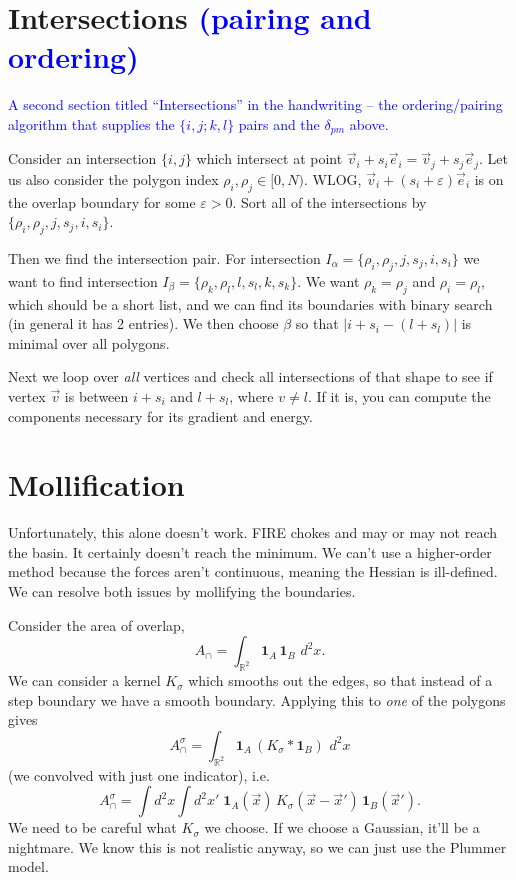\documentclass[11pt]{article}
\numberwithin{equation}{section}
\newcommand{\vv}[1]{\vec{#1}}
\newcommand{\eps}{\varepsilon}
\newcommand{\cam}[1]{\textcolor{blue}{#1}}
\begin{document}
\section{Intersections \cam{(pairing and ordering)}}

\cam{A second section titled ``Intersections'' in the handwriting -- the ordering/pairing algorithm
that supplies the $\{i,j;k,l\}$ pairs and the $\delta_{pm}$ above.}

Consider an intersection $\{i,j\}$ which intersect at point $\vv v_i+s_i\vv e_i=\vv v_j+s_j\vv e_j$.
Let us also consider the polygon index $\rho_i,\rho_j\in[0,N)$. WLOG, $\vv v_i+(s_i+\eps)\vv e_i$ is
on the overlap boundary for some $\eps>0$. Sort all of the intersections by
$\{\rho_i,\rho_j,j,s_j,i,s_i\}$.

Then we find the intersection pair. For intersection $I_\alpha=\{\rho_i,\rho_j,j,s_j,i,s_i\}$ we want
to find intersection $I_\beta=\{\rho_k,\rho_l,l,s_l,k,s_k\}$. We want $\rho_k=\rho_j$ and
$\rho_i=\rho_l$, which should be a short list, and we can find its boundaries with binary search (in
general it has 2 entries). We then choose $\beta$ so that $|i+s_i-(l+s_l)|$ is minimal over all
polygons.

Next we loop over \emph{all} vertices and check all intersections of that shape to see if vertex
$\vv v$ is between $i+s_i$ and $l+s_l$, where $v\neq l$. If it is, you can compute the components
necessary for its gradient and energy.

\section{Mollification}

Unfortunately, this alone doesn't work. FIRE chokes and may or may not reach the basin. It certainly
doesn't reach the minimum. We can't use a higher-order method because the forces aren't continuous,
meaning the Hessian is ill-defined. We can resolve both issues by mollifying the boundaries.

Consider the area of overlap,
\begin{equation}\label{eq:Acap-sharp}
  A_\cap=\int_{\mathbb R^2}\mathbf 1_A\,\mathbf 1_B\,\,d^2x.
\end{equation}
We can consider a kernel $K_\sigma$ which smooths out the edges, so that instead of a step boundary we
have a smooth boundary. Applying this to \emph{one} of the polygons gives
\begin{equation}\label{eq:Acap-conv}
  A_\cap^\sigma=\int_{\mathbb R^2}\mathbf 1_A\,(K_\sigma*\mathbf 1_B)\,\,d^2x
\end{equation}
(we convolved with just one indicator), i.e.
\begin{equation}\label{eq:Acap-double}
  A_\cap^\sigma=\int\!d^2x\int\!d^2x'\;\mathbf 1_A(\vv x)\,K_\sigma(\vv x-\vv x')\,\mathbf 1_B(\vv x').
\end{equation}
We need to be careful what $K_\sigma$ we choose. If we choose a Gaussian, it'll be a nightmare. We know
this is not realistic anyway, so we can just use the Plummer model.
\end{document}
